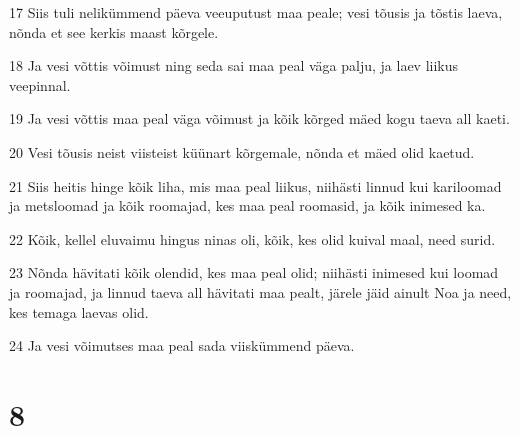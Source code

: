 \par 17 Siis tuli nelikümmend päeva veeuputust maa peale; vesi tõusis ja tõstis laeva, nõnda et see kerkis maast kõrgele.
\par 18 Ja vesi võttis võimust ning seda sai maa peal väga palju, ja laev liikus veepinnal.
\par 19 Ja vesi võttis maa peal väga võimust ja kõik kõrged mäed kogu taeva all kaeti.
\par 20 Vesi tõusis neist viisteist küünart kõrgemale, nõnda et mäed olid kaetud.
\par 21 Siis heitis hinge kõik liha, mis maa peal liikus, niihästi linnud kui kariloomad ja metsloomad ja kõik roomajad, kes maa peal roomasid, ja kõik inimesed ka.
\par 22 Kõik, kellel eluvaimu hingus ninas oli, kõik, kes olid kuival maal, need surid.
\par 23 Nõnda hävitati kõik olendid, kes maa peal olid; niihästi inimesed kui loomad ja roomajad, ja linnud taeva all hävitati maa pealt, järele jäid ainult Noa ja need, kes temaga laevas olid.
\par 24 Ja vesi võimutses maa peal sada viiskümmend päeva.

\chapter{8}

